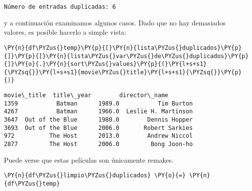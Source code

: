     \begin{Verbatim}[commandchars=\\\{\}]
Número de entradas duplicadas: 6
    \end{Verbatim}

    y a continuación examinamos algunos casos. Dado que no hay demasiados
valores, es posible hacerlo a simple vista:

    \begin{tcolorbox}[breakable, size=fbox, boxrule=1pt, pad at break*=1mm,colback=cellbackground, colframe=cellborder]
\begin{Verbatim}[commandchars=\\\{\}]
\PY{n}{df\PYZus{}temp}\PY{p}{[}\PY{n}{lista\PYZus{}duplicados}\PY{p}{]}\PY{p}{[}\PY{n}{lista\PYZus{}var\PYZus{}de\PYZus{}duplicados}\PY{p}{]}\PY{o}{.}\PY{n}{sort\PYZus{}values}\PY{p}{(}\PY{l+s+s1}{\PYZsq{}}\PY{l+s+s1}{movie\PYZus{}title}\PY{l+s+s1}{\PYZsq{}}\PY{p}{)}
\end{Verbatim}
\end{tcolorbox}

            \begin{tcolorbox}[breakable, size=fbox, boxrule=.5pt, pad at break*=1mm, opacityfill=0]
\begin{Verbatim}[commandchars=\\\{\}]
          movie\_title  title\_year        director\_name
1359           Batman      1989.0           Tim Burton
4267           Batman      1966.0  Leslie H. Martinson
3647  Out of the Blue      1980.0        Dennis Hopper
3693  Out of the Blue      2006.0       Robert Sarkies
972          The Host      2013.0        Andrew Niccol
2877         The Host      2006.0         Bong Joon-ho
\end{Verbatim}
\end{tcolorbox}
        
    Puede verse que estas películas son únicamente remakes.

    \begin{tcolorbox}[breakable, size=fbox, boxrule=1pt, pad at break*=1mm,colback=cellbackground, colframe=cellborder]
\begin{Verbatim}[commandchars=\\\{\}]
\PY{n}{df\PYZus{}limpio\PYZus{}duplicados} \PY{o}{=} \PY{n}{df\PYZus{}temp}
\end{Verbatim}
\end{tcolorbox}

